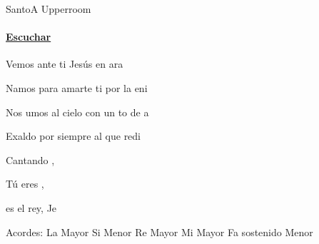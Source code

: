 \documentclass[12pt, spanish]{book}
\begin{document}
    \begin{song}{Santo}{A}
    {} %
    {Upperroom}
    {} %
    {}
        \ifChordBk
          \paragraph{\mbox{}\hfill\protect\href{https://open.spotify.com/intl-es/track/4rsEJ8Bm4wAlsc5AuBhmo0}{Escuchar}\mbox{}\hfill}
        \fi

        \begin{SBOpGroup}
            Vemos ante ti Jesús en ara

            Namos para amarte ti por la eni
        \end{SBOpGroup}

        \begin{SBOpGroup}
            Nos umos al cielo con un to de a

            Exaldo por siempre al que  redi
        \end{SBOpGroup}

        \begin{SBChorus}
            Cantando , 

            Tú eres , 
        \end{SBChorus}

        \begin{SBOpGroup}
             es el rey,  Je
        \end{SBOpGroup}

        \ifChordBk
        \begin{SBOpGroup}
            Acordes:
            \upchord{\A}\qquad La Mayor \hfill
            \upchord{\Bm}\qquad Si Menor \hfill\null\break
            \upchord{\D}\qquad Re Mayor \hfill
            \upchord{\E}\qquad Mi Mayor \hfill\null\break
            \upchord{\Fsm}\qquad Fa sostenido Menor \hfill\null\break
        \end{SBOpGroup}
        \fi
    \end{song}
\end{document}

